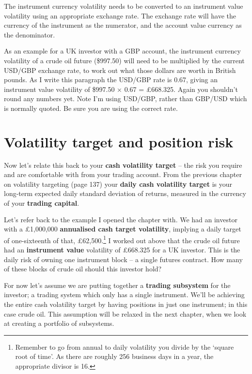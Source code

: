 The instrument currency volatility needs to be converted to an instrument value volatility using an appropriate exchange rate. The exchange rate will have the currency of the instrument as the numerator, and the account value currency as the denominator.

As an example for a UK investor with a GBP account, the instrument currency volatility of a crude oil future (\$997.50) will need to be multiplied by the current USD/GBP exchange rate, to work out what those dollars are worth in British pounds. As I write this paragraph the USD/GBP rate is 0.67, giving an instrument value volatility of \$997.50 × 0.67 = £668.325. Again you shouldn't round any numbers yet. Note I'm using USD/GBP, rather than GBP/USD which is normally quoted. Be sure you are using the correct rate.

\section*{Volatility target and position risk}  {}

Now let's relate this back to your \textbf{cash volatility target} -- the risk you require and are comfortable with from your trading account. From the previous chapter on volatility targeting (page 137) your \textbf{daily cash volatility target} is your long-term expected daily standard deviation of returns, measured in the currency of your \textbf{trading capital}.

Let's refer back to the example I opened the chapter with. We had an investor with a £1,000,000 \textbf{annualised cash target volatility}, implying a daily target of one-sixteenth of that, £62,500.\footnote{Remember to go from annual to daily volatility you divide by the ‘square root of time'. As there are roughly 256 business days in a year, the appropriate divisor is 16.} I worked out above that the crude oil future had an \textbf{instrument value} volatility of £668.325 for a UK investor. This is the daily risk of owning one instrument block -- a single futures contract. How many of these blocks of crude oil should this investor hold?

For now let's assume we are putting together a \textbf{trading subsystem} for the investor; a trading system which only has a single instrument. We'll be achieving the entire cash volatility target by having positions in just one instrument; in this case crude oil. This assumption will be relaxed in the next chapter, when we look at creating a portfolio of subsystems.

